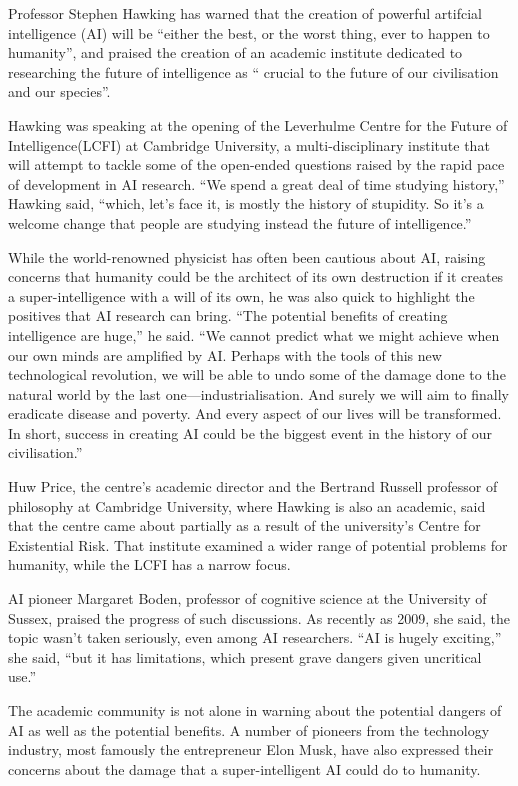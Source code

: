 \documentclass[UTF8,11pt]{ctexart}
\begin{document}
Professor Stephen Hawking has warned that the creation of powerful artifcial intelligence (AI) will be “either the best, or the worst thing, ever to happen to humanity”, and praised the creation of an academic institute dedicated to researching the future of intelligence as “ crucial to the future of our civilisation and our species”.


Hawking was speaking at the opening of the Leverhulme Centre for the Future of Intelligence(LCFI) at Cambridge University, a multi-disciplinary institute that will attempt to tackle some of the open-ended questions raised by the rapid pace of development in AI research. “We spend a great deal of time studying history,” Hawking said, “which, let’s face it, is mostly the history of stupidity. So it’s a welcome change that people are studying instead the future of intelligence.”


While the world-renowned physicist has often been cautious about AI, raising concerns that humanity could be the architect of its own destruction if it creates a super-intelligence with a will of its own, he was also quick to highlight the positives that AI research can bring. “The potential benefits of creating intelligence are huge,” he said. “We cannot predict what we might achieve when our own minds are amplified by AI. Perhaps with the tools of this new technological revolution, we will be able to undo some of the damage done to the natural world by the last one—industrialisation. And surely we will aim to finally eradicate disease and poverty. And every aspect of our lives will be transformed. In short, success in creating AI could be the biggest event in the history of our civilisation.”


Huw Price, the centre’s academic director and the Bertrand Russell professor of philosophy at Cambridge University, where Hawking is also an academic, said that the centre came about partially as a result of the university’s Centre for Existential Risk. That institute examined a wider range of potential problems for humanity, while the LCFI has a narrow focus.


AI pioneer Margaret Boden, professor of cognitive science at the University of Sussex, praised the progress of such discussions. As recently as 2009, she said, the topic wasn’t taken seriously, even among AI researchers. “AI is hugely exciting,” she said, “but it has limitations, which present grave dangers given uncritical use.”


The academic community is not alone in warning about the potential dangers of AI as well as the potential benefits. A number of pioneers from the technology industry, most famously the entrepreneur Elon Musk, have also expressed their concerns about the damage that a super-intelligent AI could do to humanity.
\end{document}
